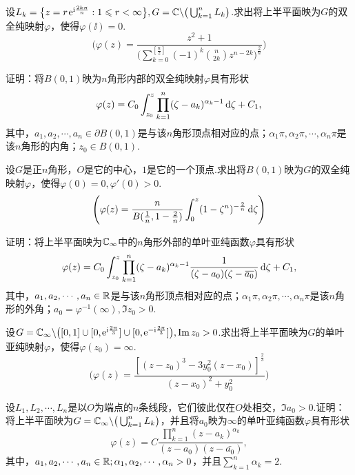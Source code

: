 \begin{xiti}
  \item 设$L_k=\big\{z=r\operatorname{\!\!\;\mathrm e}^{\mathrm i\frac{2k\uppi}n}:1\leqslant r<\infty\big\},G=\mathbb C\backslash
     \big(\bigcup_{k=1}^nL_k\big)$.求出将上半平面映为$G$的双全纯映射$\varphi$，使得$\varphi(\ii)=0$.
     \[
       \Bigg(\varphi(z) = \frac{z^2+1}{\bigg(\sum_{k=0}^{[\frac n2]}
       (-1)^k\binom n{2k}z^{n-2k}\bigg)^{\frac2n}}\Bigg)
     \]
  \item 证明：将$B(0,1)$映为$n$角形内部的双全纯映射$\varphi$具有形状
      \[
        \varphi(z) = C_0\int_{z_0}^z\prod_{k=1}^n(\zeta-a_k)^{\alpha_k-1}\mathop{}\!\mathrm{d} \zeta+C_1,
      \]
      其中，$a_1,a_2,\cdots,a_n\in\partial B(0,1)$是与该$n$角形顶点相对应的点；$\alpha_1\pi,\alpha_2\pi,\cdots,\alpha_n\pi$是该$n$角形的内角；$z_0\in B(0,1)$.
  \item 设$G$是正$n$角形，$O$是它的中心，$1$是它的一个顶点.求出将$B(0,1)$映为$G$的双全纯映射$\varphi$，使得$\varphi(0)=0,\varphi'(0)>0$.
      \[
        \Bigg(\varphi(z) = \frac n{B(\frac1n,1-\frac2n)}\int_0^z(1-\zeta^n)^{-\frac2n}\mathop{}\!\mathrm{d} \zeta\Bigg)
      \]
  \item 证明：将上半平面映为$\mathbb C_\infty$中的$n$角形外部的单叶亚纯函数$\varphi$具有形状
      \[
        \varphi(z) = C_0\int_{z_0}^z\prod_{k=1}^n(\zeta-a_k)^{\alpha_k-1}
        \frac1{(\zeta-a_0)(\zeta-{}\mkern1mu\overline{\mkern-1mua_0})}\mathop{}\!\mathrm{d} \zeta+C_1,
      \]
      其中，$a_1,a_2,\cdots,a_n\in\mathbb R$是与该$n$角形顶点相对应的点；$\alpha_1\pi,\alpha_2\pi,\cdots,\alpha_n\pi$是该$n$角形的外角；$a_0=\varphi^{-1}(\infty),\Im z_0>0$.
  \item 设$G=\mathbb C_\infty\backslash\big([0,1]\cup[0,\operatorname{\!\!\;\mathrm e}^{\mathrm i\frac{2\uppi}3}]\cup
      [0,\operatorname{\!\!\;\mathrm e}^{-\mathrm i\frac{2\uppi}3}]\big),\operatorname{Im} z_0>0$.求出将上半平面映为$G$的单叶亚纯映射$\varphi$，使得$\varphi(z_0)=\infty$.
      \[
        \bigg(\varphi(z) = \frac{[(z-z_0)^3-3y_0^2(z-x_0)]^{\frac23}}{(z-x_0)^2+y_0^2}\bigg)
      \]
  \item 设$L_1,L_2,\cdots,L_n$是以$O$为端点的$n$条线段，它们彼此仅在$O$处相交，$\Im a_0>0$.证明：将上半平面映为$G=\mathbb C_\infty\backslash\big(\bigcup_{k=1}^n
      L_k\big)$，并且将$a_0$映为$\infty$的单叶亚纯函数$\varphi$具有形状
      \[
        \varphi(z) = C\frac{\prod_{k=1}^n(z-a_k)^{\alpha_k}}{(z-a_0)(z-\bar{a_0})},
      \]
      其中，$a_1,a_2,\cdots,a_n\in\mathbb R;\alpha_1,\alpha_2,\cdots,\alpha_n>0$，并且$\sum_{k=1}^n\alpha_k=2$.

\end{xiti}
